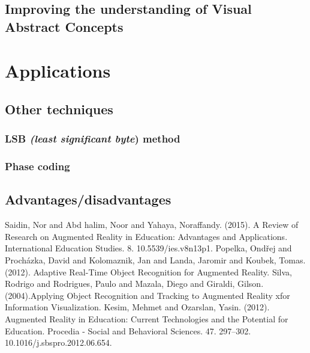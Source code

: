 \documentclass[12 pct]{report}
\begin{document}
\section{Improving the understanding of Visual Abstract Concepts}





\chapter{Applications}
\section{Other techniques}
\subsection{LSB \emph{(least significant byte}) method}
\subsection{Phase coding}
\section{Advantages/disadvantages}




\begin{thebibliography}{3}
Saidin, Nor and Abd halim, Noor and Yahaya, Noraffandy. (2015). A Review of Research on Augmented Reality in Education: Advantages and Applications. International Education Studies. 8. 10.5539/ies.v8n13p1. 
Popelka, Ondřej and Procházka, David and Kolomaznik, Jan and Landa, Jaromir and Koubek, Tomas. (2012). Adaptive Real-Time Object Recognition for Augmented Reality. 
Silva, Rodrigo and Rodrigues, Paulo and Mazala, Diego and Giraldi, Gilson. (2004).Applying Object Recognition and Tracking to Augmented Reality xfor Information Visualization. 
Kesim, Mehmet and Ozarslan, Yasin. (2012). Augmented Reality in Education: Current Technologies and the Potential for Education. Procedia - Social and Behavioral Sciences. 47. 297–302. 10.1016/j.sbspro.2012.06.654. 
\end{thebibliography}
\end{document}
